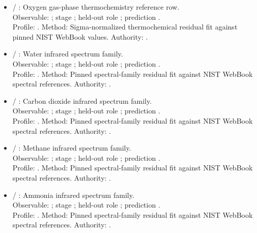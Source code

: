 \begin{itemize}
\item {} / : Oxygen gas-phase thermochemistry reference row.\\ Observable: ; stage ; held-out role ; prediction .\\ Profile: . Method: Sigma-normalized thermochemical residual fit against pinned NIST WebBook values. Authority: .
\item {} / : Water infrared spectrum family.\\ Observable: ; stage ; held-out role ; prediction .\\ Profile: . Method: Pinned spectral-family residual fit against NIST WebBook spectral references. Authority: .
\item {} / : Carbon dioxide infrared spectrum family.\\ Observable: ; stage ; held-out role ; prediction .\\ Profile: . Method: Pinned spectral-family residual fit against NIST WebBook spectral references. Authority: .
\item {} / : Methane infrared spectrum family.\\ Observable: ; stage ; held-out role ; prediction .\\ Profile: . Method: Pinned spectral-family residual fit against NIST WebBook spectral references. Authority: .
\item {} / : Ammonia infrared spectrum family.\\ Observable: ; stage ; held-out role ; prediction .\\ Profile: . Method: Pinned spectral-family residual fit against NIST WebBook spectral references. Authority: .

\end{itemize}
